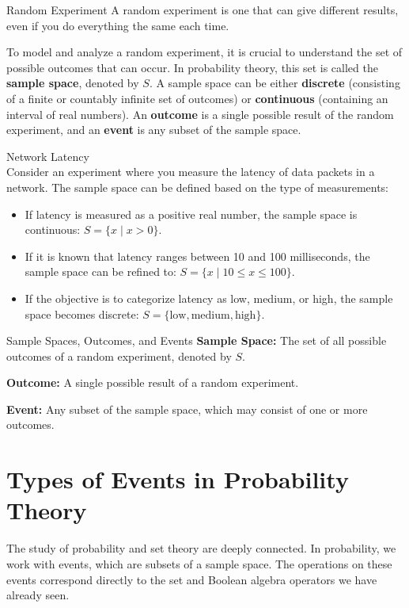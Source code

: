\begin{definition}{Random Experiment}
    A random experiment is one that can give different results, even if you do everything the same each time.
\end{definition}

To model and analyze a random experiment, it is crucial to understand the set of possible outcomes that can occur. In probability theory, this set is called the \textbf{sample space}, denoted by \( S \). A sample space can be either \textbf{discrete} (consisting of a finite or countably infinite set of outcomes) or \textbf{continuous} (containing an interval of real numbers). An \textbf{outcome} is a single possible result of the random experiment, and an \textbf{event} is any subset of the sample space.

\begin{example}{Network Latency} \\
Consider an experiment where you measure the latency of data packets in a network. The sample space can be defined based on the type of measurements:
\begin{itemize}
    \item If latency is measured as a positive real number, the sample space is continuous: $S = \{ x \mid x > 0 \}$.
    \item If it is known that latency ranges between 10 and 100 milliseconds, the sample space can be refined to: $S = \{ x \mid 10 \leq x \leq 100 \}$.
    \item If the objective is to categorize latency as low, medium, or high, the sample space becomes discrete: $S = \{\text{low}, \text{medium}, \text{high}\}$.
\end{itemize}
\end{example}

\begin{definition}{Sample Spaces, Outcomes, and Events}
    \textbf{Sample Space:} The set of all possible outcomes of a random experiment, denoted by \( S \).
    
    \textbf{Outcome:} A single possible result of a random experiment.
    
    \textbf{Event:} Any subset of the sample space, which may consist of one or more outcomes.
\end{definition}

\section{Types of Events in Probability Theory}
\label{subsec:types_events}
The study of probability and set theory are deeply connected. In probability, we work with events, which are subsets of a sample space. The operations on these events correspond directly to the set and Boolean algebra operators we have already seen.

